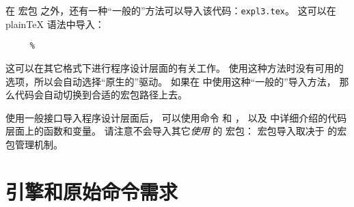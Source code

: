 \documentclass{l3doc}
\begin{document}
%
在 \LaTeXe{} 宏包  之外，还有一种“一般的”方法可以导入该代码：\texttt{expl3.tex}。
这可以在 plain\TeX{} 语法中导入：
\begin{verbatim}
     %
\end{verbatim}
这可以在其它格式下进行程序设计层面的有关工作。
使用这种方法时没有可用的选项，所以会自动选择“原生的”驱动。
如果在 \LaTeXe{} 中使用这种“一般的”导入方法，
那么代码会自动切换到合适的宏包路径上去。

%
使用一般接口导入程序设计层面后，
可以使用命令   和 ，
以及  中详细介绍的代码层面上的函数和变量。
请注意不会导入其它\emph{使用}  的 \LaTeXe{} 宏包：
宏包导入取决于 \LaTeXe{} 的宏包管理机制。

%
\section{引擎和原始命令需求}
\end{document}
